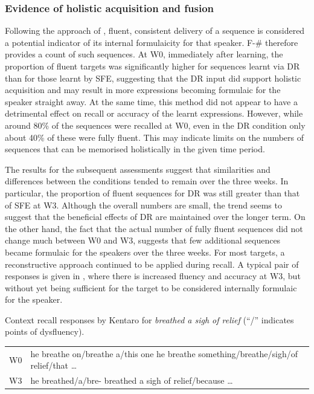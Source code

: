 \documentclass[output=paper]{langscibook}
\begin{document}
\subsubsection{Evidence of holistic acquisition and fusion}
Following the approach of \citet{MylesCordier2017}, fluent, consistent delivery of a sequence is considered a potential indicator of its internal formulaicity for that speaker. F-\# therefore provides a count of such sequences. At W0, immediately after learning, the proportion of fluent targets was significantly higher for sequences learnt via DR than for those learnt by SFE, suggesting that the DR input did support holistic acquisition and may result in more expressions becoming formulaic for the speaker straight away. At the same time, this method did not appear to have a detrimental effect on recall or accuracy of the learnt expressions. However, while around 80\% of the sequences were recalled at W0, even in the DR condition only about 40\% of these were fully fluent. This may indicate limits on the numbers of sequences that can be memorised holistically in the given time period.

The results for the subsequent assessments suggest that similarities and differences between the conditions tended to remain over the three weeks. In particular, the proportion of fluent sequences for DR was still greater than that of SFE at W3. Although the overall numbers are small, the trend seems to suggest that the beneficial effects of DR are maintained over the longer term. On the other hand, the fact that the actual number of fully fluent sequences did not change much between W0 and W3, suggests that few additional sequences became formulaic for the speakers over the three weeks. For most targets, a reconstructive approach continued to be applied during recall. A typical pair of responses is given in , where there is increased fluency and accuracy at W3, but without yet being sufficient for the target to be considered internally formulaic for the speaker.


\ea Context recall responses by Kentaro for \textit{breathed a sigh of relief} (``/'' indicates points of dysfluency).\label{ex:cutler:1}\smallskip\\
\begin{tabularx}{\linewidth}{@{}lQ@{}}
W0 & he breathe on\slash breathe a\slash this one he breathe something\slash breathe\slash sigh\slash of relief\slash that …\\
W3 & he breathed\slash a\slash bre- breathed a sigh of relief\slash because …\\
\end{tabularx}
\z
\end{document}
